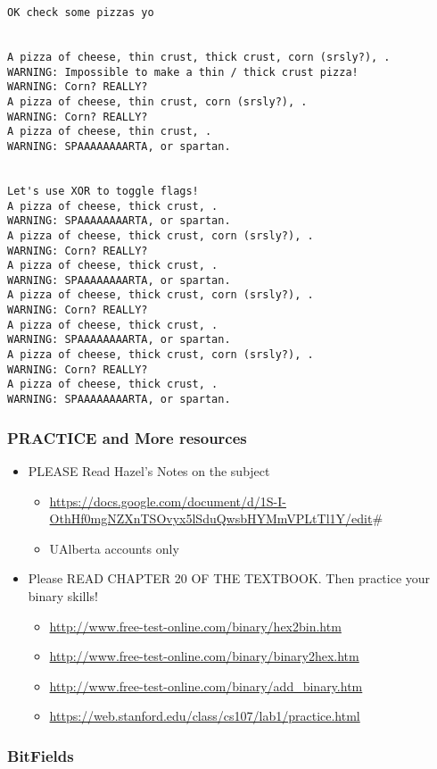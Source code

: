 \documentclass[11pt]{article}
\begin{document}
\begin{enumerate}
\begin{verbatim}
OK check some pizzas yo


A pizza of cheese, thin crust, thick crust, corn (srsly?), .
WARNING: Impossible to make a thin / thick crust pizza!
WARNING: Corn? REALLY?
A pizza of cheese, thin crust, corn (srsly?), .
WARNING: Corn? REALLY?
A pizza of cheese, thin crust, .
WARNING: SPAAAAAAAARTA, or spartan.


Let's use XOR to toggle flags!
A pizza of cheese, thick crust, .
WARNING: SPAAAAAAAARTA, or spartan.
A pizza of cheese, thick crust, corn (srsly?), .
WARNING: Corn? REALLY?
A pizza of cheese, thick crust, .
WARNING: SPAAAAAAAARTA, or spartan.
A pizza of cheese, thick crust, corn (srsly?), .
WARNING: Corn? REALLY?
A pizza of cheese, thick crust, .
WARNING: SPAAAAAAAARTA, or spartan.
A pizza of cheese, thick crust, corn (srsly?), .
WARNING: Corn? REALLY?
A pizza of cheese, thick crust, .
WARNING: SPAAAAAAAARTA, or spartan.
\end{verbatim}
\end{enumerate}

\subsubsection{PRACTICE and More resources}
\label{sec:orge273ed8}

\begin{itemize}
\item PLEASE Read Hazel's Notes on the subject 
\begin{itemize}
\item \url{https://docs.google.com/document/d/1S-I-OthHf0mgNZXnTSOvyx5lSduQwsbHYMmVPLtTl1Y/edit}\#
\item UAlberta accounts only
\end{itemize}

\item Please READ CHAPTER 20 OF THE TEXTBOOK. Then practice your binary skills!
\begin{itemize}
\item \url{http://www.free-test-online.com/binary/hex2bin.htm}
\item \url{http://www.free-test-online.com/binary/binary2hex.htm}
\item \url{http://www.free-test-online.com/binary/add\_binary.htm}
\item \url{https://web.stanford.edu/class/cs107/lab1/practice.html}
\end{itemize}
\end{itemize}


\subsubsection{BitFields}
\label{sec:org647f8f3}
\end{document}
